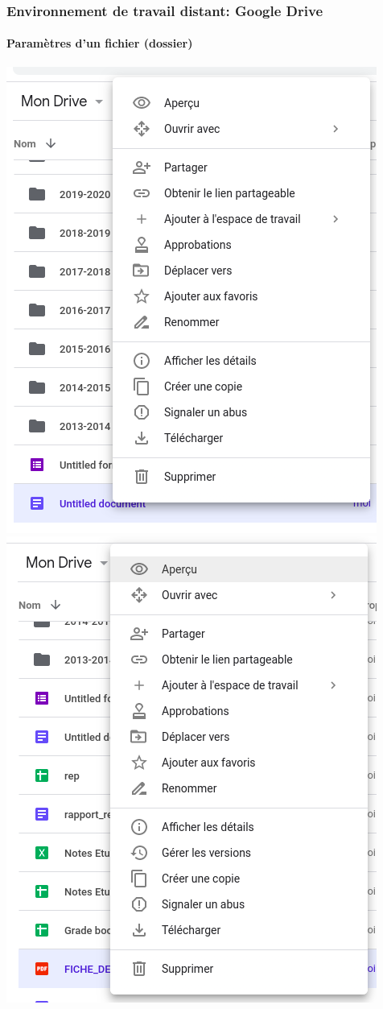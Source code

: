 \documentclass{beamer}
\begin{document}
\begin{frame}
\frametitle{Environnement de travail distant: Google Drive}
\framesubtitle{Paramètres d'un fichier (dossier)}

\begin{center}
	\includegraphics[height=
	.8\textheight]{../img/Bweb01-environnement/drive-options1.png}
	\includegraphics[height=
	.8\textheight]{../img/Bweb01-environnement/drive-options2.png}
\end{center}

\end{frame}
\end{document}
